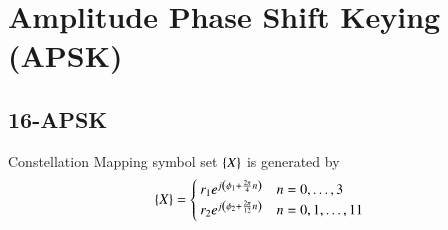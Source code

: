 \documentclass[journal,12pt,twocolumn]{IEEEtran}
\begin{document}
\section{Amplitude Phase Shift Keying (APSK)}

\subsection{16-APSK}
Constellation Mapping symbol set $\left\{X\right\}$ is generated by
\begin{equation}
\left\{X\right\}=
\begin{cases}
r_1 e^{j\left(\phi_1+\frac{2\pi}{4}n\right)}& n=0,\dots,3\\
r_2 e^{j\left(\phi_2+\frac{2\pi}{12}n\right)}& n=0,1,\dots,11
\end{cases}
\end{equation}
\end{document}
